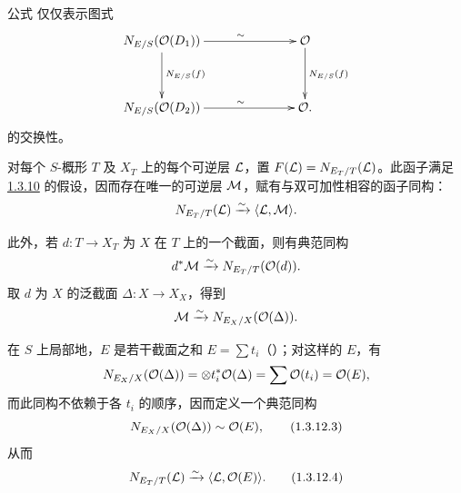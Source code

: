 公式\pageoriginale {} 仅仅表示图式 $$
\xymatrix@C=2.5cm@R=1.25cm{
N_{E/S}(\Oo(D_1))  \ar[r]^(.55){\sim} \ar[d]^{N_{E/S}(f)} & \Oo \ar[d]^{N_{E/S}(f)} \\         
N_{E/S}(\Oo(D_2))  \ar[r]^(.55){\sim} & \Oo.
}
$$ 的交换性。

对每个 $S$-概形 $T$ 及 $X_{T}$ 上的每个可逆层 ${\mathcal L}$，置 $F({\mathcal L})=N_{E_{T}/T}({\mathcal L})$。此函子满足 \hyperref[XVIII.thm1.3.10]{1.3.10} 的假设，因而存在唯一的可逆层 ${\mathcal M}$，赋有与双可加性相容的函子同构： $$
N_{E_{T}/T}({\mathcal L})\xrightarrow{\sim}\langle {\mathcal L},{\mathcal M}\rangle {}.
$$

此外，若 $d:T\rightarrow X_{T}$ 为 $X$ 在 $T$ 上的一个截面，则有典范同构 $$
d^{\ast}{\mathcal M}\xrightarrow{\sim} N_{E_{T}/T}({\mathcal O}(d)){}.
$$ 取 $d$ 为 $X$ 的泛截面 $\Delta:X\rightarrow
X_{X}$，得到 $$
{\mathcal M}\xrightarrow{\sim} N_{E_{X}/X}({\mathcal O}(\Delta)){}.
$$

在 $S$ 上局部地，$E$ 是若干截面之和 $E=\sum t_{i}$（）；对这样的 $E$，有 $$
N_{E_{X}/X}({\mathcal O}(\Delta))=\otimes
t^{\ast}_{i}{\mathcal O}(\Delta)=\sum{\mathcal O}(t_{i})={\mathcal O}(E){},
$$ 而此同构不依赖于各 $t_{i}$ 的顺序，因而定义一个典范同构 \begin{equation*}
N_{E_{X}/X}({\mathcal O}(\Delta))\sim {\mathcal O}(E){},\tag{1.3.12.3}
\end{equation*} 从而 \begin{equation*}
N_{E_{T}/T}(\Ll)\xrightarrow{\sim}\langle \Ll,\Oo(E)\rangle{\quoi}.%
\tag{1.3.12.4}
\end{equation*}

